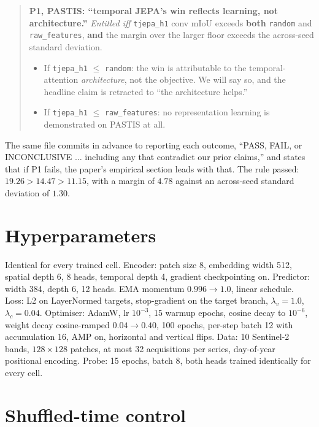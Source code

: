 \documentclass{article}
\begin{document}
\begin{quote}\small
\textbf{P1, PASTIS: ``temporal JEPA's win reflects learning, not architecture.''}
\emph{Entitled iff} \texttt{tjepa\_h1} conv mIoU exceeds \textbf{both} \texttt{random} and
\texttt{raw\_features}, \textbf{and} the margin over the larger floor exceeds the across-seed standard
deviation.
\begin{itemize}\itemsep0pt
  \item If \texttt{tjepa\_h1} $\le$ \texttt{random}: the win is attributable to the temporal-attention
        \emph{architecture}, not the objective. We will say so, and the headline claim is retracted to
        ``the architecture helps.''
  \item If \texttt{tjepa\_h1} $\le$ \texttt{raw\_features}: no representation learning is demonstrated
        on PASTIS at all.
\end{itemize}
\end{quote}

The same file commits in advance to reporting each outcome, ``PASS, FAIL, or INCONCLUSIVE
$\ldots$ including any that contradict our prior claims,'' and states that if P1 fails, the paper's
empirical section leads with that. The rule passed: $19.26 > 14.47 > 11.15$, with a margin of $4.78$
against an across-seed standard deviation of $1.30$.

\section{Hyperparameters}
\label{app:hparams}

Identical for every trained cell. Encoder: patch size 8, embedding width 512, spatial depth 6, 8
heads, temporal depth 4, gradient checkpointing on. Predictor: width 384, depth 6, 12 heads. EMA
momentum $0.996 \rightarrow 1.0$, linear schedule. Loss: L2 on LayerNormed targets, stop-gradient on
the target branch, $\lambda_v{=}1.0$, $\lambda_c{=}0.04$. Optimiser: AdamW, lr $10^{-3}$, 15 warmup
epochs, cosine decay to $10^{-6}$, weight decay cosine-ramped $0.04 \rightarrow 0.40$, 100 epochs,
per-step batch 12 with accumulation 16, AMP on, horizontal and vertical flips. Data: 10 Sentinel-2
bands, $128{\times}128$ patches, at most 32 acquisitions per series, day-of-year positional encoding.
Probe: 15 epochs, batch 8, both heads trained identically for every cell.

\section{Shuffled-time control}
\label{app:shuffle}
\end{document}
